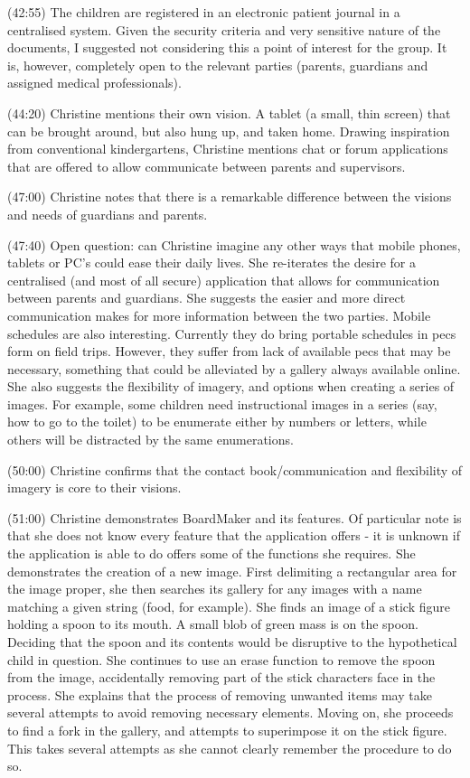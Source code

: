 (42:55) The children are registered in an electronic patient journal in a centralised system. Given the security criteria and very sensitive nature of the documents, I suggested not considering this a point of interest for the group. It is, however, completely open to the relevant parties (parents, guardians and assigned medical professionals).

(44:20) Christine mentions their own vision. A tablet (a small, thin screen) that can be brought around, but also hung up, and taken home. Drawing inspiration from conventional kindergartens, Christine mentions chat or forum applications that are offered to allow communicate between parents and supervisors.

(47:00) Christine notes that there is a remarkable difference between the visions and needs of guardians and parents.

(47:40) Open question: can Christine imagine any other ways that mobile phones, tablets or PC's could ease their daily lives. She re-iterates the desire for a centralised (and most of all secure) application that allows for communication between parents and guardians. She suggests the easier and more direct communication makes for more information between the two parties. Mobile schedules are also interesting. Currently they do bring portable schedules in pecs form on field trips. However, they suffer from lack of available pecs that may be necessary, something that could be alleviated by a gallery always available online. She also suggests the flexibility of imagery, and options when creating a series of images. For example, some children need instructional images in a series (say, how to go to the toilet) to be enumerate either by numbers or letters, while others will be distracted by the same enumerations.

(50:00) Christine confirms that the contact book/communication and flexibility of imagery is core to their visions.

(51:00) Christine demonstrates BoardMaker and its features. Of particular note is that she does not know every feature that the application offers - it is unknown if the application is able to do offers some of the functions she requires. She demonstrates the creation of a new image. First delimiting a rectangular area for the image proper, she then searches its gallery for any images with a name matching a given string (food, for example). She finds an image of a stick figure holding a spoon to its mouth. A small blob of green mass is on the spoon. Deciding that the spoon and its contents would be disruptive to the hypothetical child in question. She continues to use an erase function to remove the spoon from the image, accidentally removing part of the stick characters face in the process. She explains that the process of removing unwanted items may take several attempts to avoid removing necessary elements. Moving on, she proceeds to find a fork in the gallery, and attempts to superimpose it on the stick figure. This takes several attempts as she cannot clearly remember the procedure to do so.

